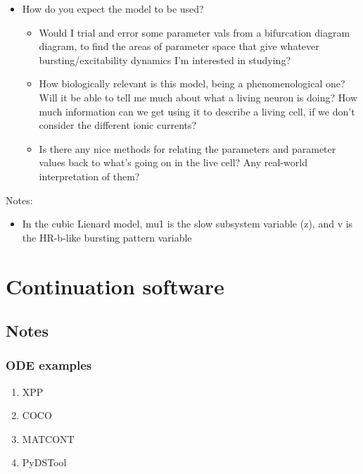 \documentclass[11pt]{article}
\begin{document}
\begin{itemize}
\item How do you expect the model to be used?
\begin{itemize}
\item Would I trial and error some parameter vals from a bifurcation diagram diagram, to find the areas of parameter space that give whatever bursting/excitability dynamics I'm interested in studying?
\item How biologically relevant is this model, being a phenomenological one? Will it be able to tell me much about what a living neuron is doing? How much information can we get using it to describe a living cell, if we don't consider the different ionic currents?
\item Is there any nice methods for relating the parameters and parameter values back to what's going on in the live cell? Any real-world interpretation of them?
\end{itemize}
\end{itemize}

Notes:
\begin{itemize}
\item In the cubic Lienard model, mu1 is the slow subsystem variable (z), and v is the HR-b-like bursting pattern variable
\end{itemize}

\newpage
\section{Continuation software}
\label{sec:org8fd785f}
\subsection{Notes}
\label{sec:orgbde0df7}
\subsubsection{ODE examples}
\label{sec:orgbc12d5a}
\begin{enumerate}
\item XPP
\label{sec:orgbde6a57}
\item COCO
\label{sec:org1573758}
\item MATCONT
\label{sec:orgedff95d}
\item PyDSTool
\label{sec:orgba202cb}
\end{enumerate}
\end{document}
